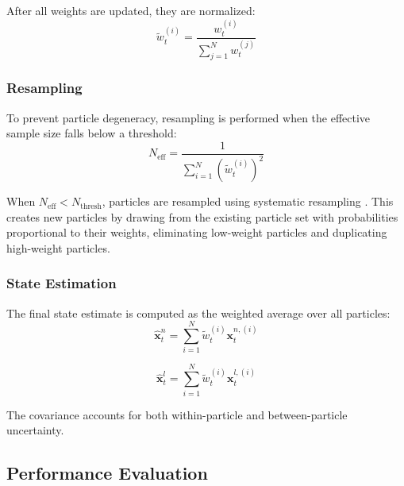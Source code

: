 \documentclass[letterpaper,times]{IONconf}
\begin{document}
After all weights are updated, they are normalized:
\begin{equation}
\tilde{w}^{(i)}_t = \frac{w^{(i)}_t}{\sum_{j=1}^{N} w^{(j)}_t}
\end{equation}

\subsubsection{Resampling}

To prevent particle degeneracy, resampling is performed when the effective sample size falls below a threshold:
\begin{equation}
N_{\text{eff}} = \frac{1}{\sum_{i=1}^{N} (\tilde{w}^{(i)}_t)^2}
\end{equation}

When \(N_{\text{eff}} < N_{\text{thresh}}\), particles are resampled using systematic resampling \citep{canciani2017airborne}. This creates new particles by drawing from the existing particle set with probabilities proportional to their weights, eliminating low-weight particles and duplicating high-weight particles.

\subsubsection{State Estimation}

The final state estimate is computed as the weighted average over all particles:
\begin{equation}
\hat{\mathbf{x}}^n_t = \sum_{i=1}^{N} \tilde{w}^{(i)}_t \mathbf{x}^{n,(i)}_t
\end{equation}

\begin{equation}
\hat{\mathbf{x}}^l_t = \sum_{i=1}^{N} \tilde{w}^{(i)}_t \mathbf{x}^{l,(i)}_t
\end{equation}

The covariance accounts for both within-particle and between-particle uncertainty.

\subsection{Performance Evaluation}
\end{document}
